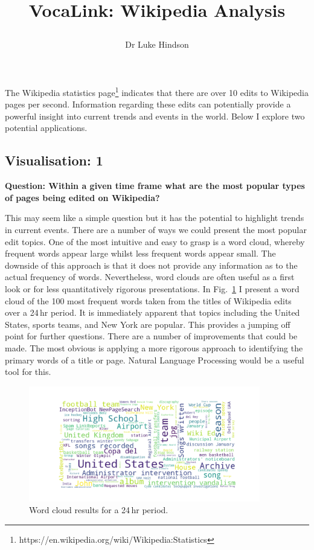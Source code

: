 \documentclass[a4paper, 12pt]{article}
\author{Dr Luke Hindson}
\title{\vspace{-1.45cm}VocaLink: Wikipedia Analysis
\date{}
}
\begin{document}
\maketitle
\vspace{-10pt}

\noindent The Wikipedia statistics page\footnote{https://en.wikipedia.org/wiki/Wikipedia:Statistics} indicates that there are over 10 edits to Wikipedia pages per second. Information regarding these edits can potentially provide a powerful insight into current trends and events in the world. Below I explore two potential applications.

\subsection*{Visualisation: 1}

\textbf{Question: Within a given time frame what are the most popular types of pages being edited on Wikipedia?}

\noindent This may seem like a simple question but it has the potential to highlight trends in current events. There are a number of ways we could present the most popular edit topics. One of the most intuitive and easy to grasp is a word cloud, whereby frequent words appear large whilst less frequent words appear small. The downside of this approach is that it does not provide any information as to the actual frequency of words. Nevertheless, word clouds are often useful as a first look or for less quantitatively rigorous presentations.  In Fig.~\ref{im:1} I present a word cloud of the 100 most frequent words taken from the titles of Wikipedia edits over a 24\,hr period. It is immediately apparent that topics including the United States, sports teams, and New York are popular. This provides a jumping off point for further questions. There are a number of improvements that could be made. The most obvious is applying a more rigorous approach to identifying the primary words of a title or page.  Natural Language Processing would be a useful tool for this. 

\begin{figure}[h]
\begin{center}
\includegraphics[width=0.9\textwidth, trim={3cm 3cm 3cm 3cm},clip]{./IMAGES/wordcloud.png} 
\caption{Word cloud results for a 24\,hr period.}
\label{im:1}
\end{center}
\end{figure}
\end{document}
